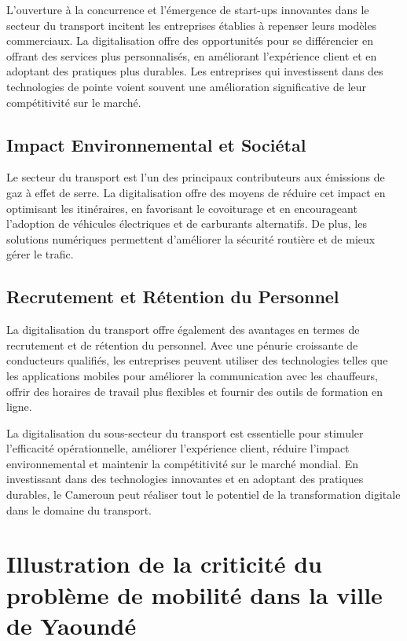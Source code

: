 \documentclass{article}
\begin{document}
L'ouverture à la concurrence et l'émergence de start-ups innovantes dans le secteur du transport incitent les entreprises établies à repenser leurs modèles commerciaux. La digitalisation offre des opportunités pour se différencier en offrant des services plus personnalisés, en améliorant l'expérience client et en adoptant des pratiques plus durables. Les entreprises qui investissent dans des technologies de pointe voient souvent une amélioration significative de leur compétitivité sur le marché.

\subsection{Impact Environnemental et Sociétal}

Le secteur du transport est l'un des principaux contributeurs aux émissions de gaz à effet de serre. La digitalisation offre des moyens de réduire cet impact en optimisant les itinéraires, en favorisant le covoiturage et en encourageant l'adoption de véhicules électriques et de carburants alternatifs. De plus, les solutions numériques permettent d'améliorer la sécurité routière et de mieux gérer le trafic.

\subsection{Recrutement et Rétention du Personnel}

La digitalisation du transport offre également des avantages en termes de recrutement et de rétention du personnel. Avec une pénurie croissante de conducteurs qualifiés, les entreprises peuvent utiliser des technologies telles que les applications mobiles pour améliorer la communication avec les chauffeurs, offrir des horaires de travail plus flexibles et fournir des outils de formation en ligne.

La digitalisation du sous-secteur du transport est essentielle pour stimuler l'efficacité opérationnelle, améliorer l'expérience client, réduire l'impact environnemental et maintenir la compétitivité sur le marché mondial. En investissant dans des technologies innovantes et en adoptant des pratiques durables, le Cameroun peut réaliser tout le potentiel de la transformation digitale dans le domaine du transport.

\section{Illustration de la criticité du problème de mobilité dans la ville de Yaoundé}
\end{document}
